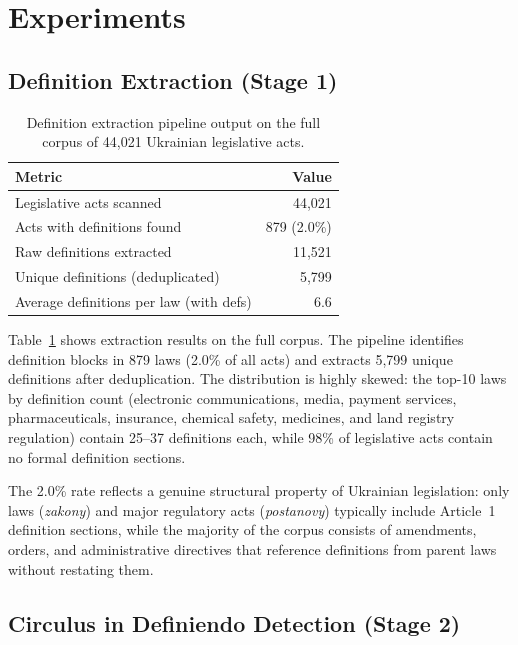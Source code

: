 \documentclass[11pt]{article}
\begin{document}
\section{Experiments}
\label{sec:experiments}

\subsection{Definition Extraction (Stage 1)}
\label{sec:exp-extraction}

\begin{table}[t]
\centering
\caption{Definition extraction pipeline output on the full corpus of 44{,}021 Ukrainian legislative acts.}
\label{tab:extraction}
\begin{tabular}{lr}
\toprule
\textbf{Metric} & \textbf{Value} \\
\midrule
Legislative acts scanned & 44{,}021 \\
Acts with definitions found & 879 (2.0\%) \\
Raw definitions extracted & 11{,}521 \\
Unique definitions (deduplicated) & 5{,}799 \\
Average definitions per law (with defs) & 6.6 \\
\bottomrule
\end{tabular}
\end{table}

Table~\ref{tab:extraction} shows extraction results on the full corpus.
The pipeline identifies definition blocks in 879 laws (2.0\% of all acts) and extracts 5{,}799 unique definitions after deduplication.
The distribution is highly skewed: the top-10 laws by definition count (electronic communications, media, payment services, pharmaceuticals, insurance, chemical safety, medicines, and land registry regulation) contain 25--37 definitions each, while 98\% of legislative acts contain no formal definition sections.

The 2.0\% rate reflects a genuine structural property of Ukrainian legislation: only laws (\emph{zakony}) and major regulatory acts (\emph{postanovy}) typically include Article~1 definition sections, while the majority of the corpus consists of amendments, orders, and administrative directives that reference definitions from parent laws without restating them.

\subsection{Circulus in Definiendo Detection (Stage 2)}
\label{sec:exp-circulus}
\end{document}
